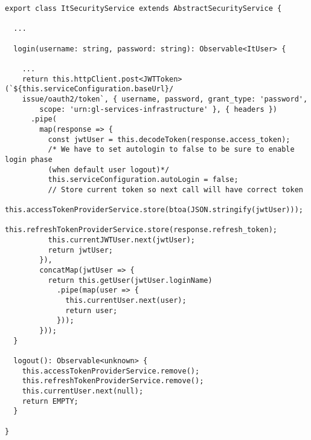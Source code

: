 \begin{lstlisting}[caption={Principali metodi della classe ItSecurityService}, style=javaScriptCode]
export class ItSecurityService extends AbstractSecurityService {
  
  ...
  
  login(username: string, password: string): Observable<ItUser> {
    
    ...
    return this.httpClient.post<JWTToken>(`${this.serviceConfiguration.baseUrl}/
    issue/oauth2/token`, { username, password, grant_type: 'password', 
        scope: 'urn:gl-services-infrastructure' }, { headers })
      .pipe(
        map(response => {
          const jwtUser = this.decodeToken(response.access_token);
          /* We have to set autologin to false to be sure to enable login phase 
          (when default user logout)*/
          this.serviceConfiguration.autoLogin = false;
          // Store current token so next call will have correct token
          this.accessTokenProviderService.store(btoa(JSON.stringify(jwtUser)));
          this.refreshTokenProviderService.store(response.refresh_token);
          this.currentJWTUser.next(jwtUser);
          return jwtUser;
        }),
        concatMap(jwtUser => {
          return this.getUser(jwtUser.loginName)
            .pipe(map(user => {
              this.currentUser.next(user);
              return user;
            }));
        }));
  }

  logout(): Observable<unknown> {
    this.accessTokenProviderService.remove();
    this.refreshTokenProviderService.remove();
    this.currentUser.next(null);
    return EMPTY;
  }

}
\end{lstlisting}
